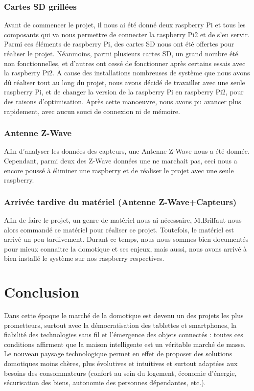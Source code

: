 \subsection{Cartes SD grillées }
Avant de commencer le projet, il nous ai été donné deux raspberry Pi et tous les composants qui va nous permettre de connecter la raspberry Pi2 et de s'en servir.\newline
Parmi ces éléments de raspberry Pi, des cartes SD nous ont été offertes pour réaliser le projet. Néanmoins, parmi plusieurs cartes SD, un grand nombre été non fonctionnelles, et d'autres ont cessé de fonctionner après certains essais avec la raspberry Pi2.\newline
A cause des installations nombreuses de système que nous avons dû réaliser tout au long du projet, nous avons décidé de travailler avec une seule raspberry Pi, et de changer la version de la raspberry Pi en raspberry Pi2, pour des raisons d'optimisation. Après cette manoeuvre, nous avons pu avancer plus rapidement, avec aucun souci de connexion ni de mémoire.
\subsection{Antenne Z-Wave}
Afin d'analyser les données des capteurs, une Antenne Z-Wave nous a été donnée. Cependant, parmi deux des Z-Wave données une ne marchait pas, ceci nous a encore poussé à éliminer une raspberry et de réaliser le projet avec une seule raspberry.
\subsection{Arrivée tardive du matériel (Antenne Z-Wave+Capteurs)}
Afin de faire le projet, un genre de matériel nous ai nécessaire, M.Briffaut nous alors commandé ce matériel pour réaliser ce projet. Toutefois, le matériel est arrivé un peu tardivement. Durant ce temps, nous nous sommes bien documentés pour mieux connaitre la domotique et ses enjeux, mais aussi, nous avons arrivé à bien installé le système sur nos raspberry respectives.   

\newpage
\chapter{Conclusion}
Dans cette époque le marché de la domotique est devenu un des projets les plus prometteurs, surtout avec la démocratisation des tablettes et smartphones, la fiabilité des technologies sans fil et l'émergence des objets connectés : toutes ces conditions affirment que la maison intelligente est un véritable marché de masse. Le nouveau paysage technologique permet en effet de proposer des solutions domotiques moins chères, plus évolutives et intuitives et surtout adaptées aux besoins des consommateurs (confort au sein du logement, économie d'énergie, sécurisation des biens, autonomie des personnes dépendantes, etc.).\newline

